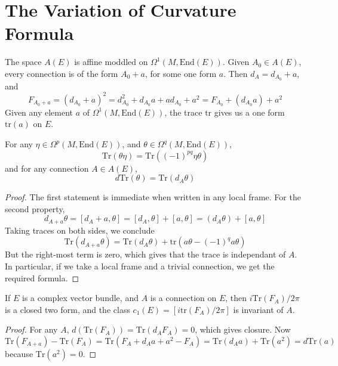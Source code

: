 \section{The Variation of Curvature Formula}

The space $A(E)$ is affine moddled on $\Omega^1(M, \text{End}(E))$. Given $A_0 \in A(E)$, every connection is of the form $A_0 + a$, for some one form $a$. Then $d_A = d_{A_0} + a$, and
%
\[ F_{A_0 + a} = (d_{A_0} + a)^2 = d_{A_0}^2 + d_{A_0} a + a d_{A_0} + a^2 = F_{A_0} + (d_{A_0} a) + a^2 \]
%
Given any element $a$ of $\Omega^1(M, \text{End}(E))$, the trace $\text{tr}$ gives us a one form $\text{tr}(a)$ on $E$.

\begin{lemma}
    For any $\eta \in \Omega^p(M,\text{End}(E))$, and $\theta \in \Omega^q(M,\text{End}(E))$,
    \[ \text{Tr}(\theta \eta) = \text{Tr}((-1)^{pq} \eta \theta) \]
    and for any connection $A \in A(E)$,
    \[ d \text{Tr}(\theta) = \text{Tr}(d_A \theta) \]
\end{lemma}
\begin{proof}
    The first statement is immediate when written in any local frame. For the second property,
    \[ d_{A + a} \theta = [d_A + a, \theta] = [d_A, \theta] + [a, \theta] = (d_A \theta) + [a,\theta] \]
    Taking traces on both sides, we conclude
    \[ \text{Tr}(d_{A + a} \theta) = \text{Tr}(d_A \theta) + \text{tr}(a \theta - (-1)^q a \theta) \]
    But the right-most term is zero, which gives that the trace is independant of $A$. In particular, if we take a local frame and a trivial connection, we get the required formula.
\end{proof}

\begin{theorem}
    If $E$ is a complex vector bundle, and $A$ is a connection on $E$, then $i \text{Tr}(F_A)/2\pi$ is a closed two form, and the class $c_1(E) = [i \text{tr}(F_A)/2 \pi]$ is invariant of $A$.
\end{theorem}
\begin{proof}
    For any $A$, $d(\text{Tr}(F_A)) = \text{Tr}(d_A F_A) = 0$, which gives closure. Now
    \[ \text{Tr}(F_{A + a}) - \text{Tr}(F_A) = \text{Tr}(F_A + d_A a + a^2 - F_A) = \text{Tr}(d_A a) + \text{Tr}(a^2) = d \text{Tr}(a) \]
    because $\text{Tr}(a^2) = 0$.
\end{proof}















